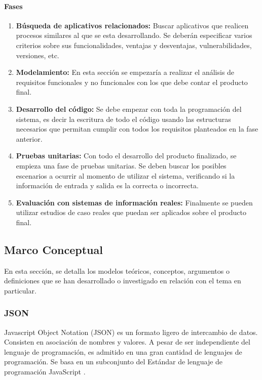 \documentclass[12pt,a4paper,final, xcolor=table, table]{article}
\begin{document}
	\paragraph{Fases}
	
	\begin{enumerate}
		\item \textbf{Búsqueda de aplicativos relacionados:} Buscar aplicativos que realicen procesos similares al que se esta desarrollando. Se deberán especificar varios criterios sobre sus funcionalidades, ventajas y desventajas, vulnerabilidades, versiones, etc. 
		\item \textbf{Modelamiento:} En esta sección se empezaría a realizar el análisis de requisitos funcionales y no funcionales con los que debe contar el producto final.
		\item \textbf{Desarrollo del código:} Se debe empezar con toda la programación del sistema, es decir la escritura de todo el código usando las estructuras necesarios que permitan cumplir con todos los requisitos planteados en la fase anterior. 
		\item \textbf{Pruebas unitarias:} Con todo el desarrollo del producto finalizado, se empieza una fase de pruebas unitarias. Se deben buscar los posibles escenarios a ocurrir al momento de utilizar el sistema,  verificando si la información de entrada y salida es la correcta o incorrecta. 		
		\item \textbf{Evaluación con sistemas de información reales:} Finalmente se pueden utilizar estudios de caso reales que puedan ser aplicados sobre el producto final.
	\end{enumerate}
	
	\subsection{Marco Conceptual}
	En esta sección, se detalla los modelos teóricos, conceptos, argumentos o definiciones que se han desarrollado o investigado en relación con el tema en particular.
	
	\subsubsection{JSON}
	
	Javascript Object Notation (JSON) es un formato ligero de intercambio de datos. Consisten en asociación de nombres y valores. A pesar de ser independiente del lenguaje de programación, es admitido en una gran cantidad de lenguajes de programación. Se basa en un subconjunto del Estándar de lenguaje de programación JavaScript \parencite{JSON}.
	
\end{document}
